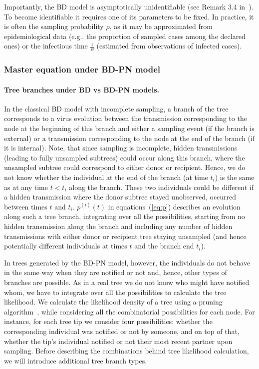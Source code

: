 \documentclass[10pt,letterpaper]{article}
\begin{document}
Importantly, the BD model is asymptotically unidentifiable (see Remark 3.4 in~\cite{Stadler2009}). To become identifiable it requires one of its parameters to be fixed. In practice, it is often the sampling probability $\rho$, as it may be approximated from epidemiological data (e.g., the proportion of sampled cases among the declared ones) or the infectious time $\frac{1}{\psi}$ (estimated from observations of infected cases). 

\subsubsection*{Master equation under BD-PN model}

\paragraph{Tree branches under BD vs BD-PN models.}

In the classical BD model with incomplete sampling, a branch of the tree corresponds to a virus evolution between the transmission corresponding to the node at the beginning of this branch and either a sampling event (if the branch is external) or a transmission corresponding to the node at the end of the branch (if it is internal). Note, that since sampling is incomplete, hidden transmissions (leading to fully unsampled subtrees) could occur along this branch, where the unsampled subtree could correspond to either donor or recipient.  Hence, we do not know whether the individual at the end of the branch (at time $t_i$) is the same as at any time $t < t_i$ along the branch. These two individuals could be different if a hidden transmission where the donor subtree stayed unobserved, occurred between times $t$ and $t_i$. $p^{(i)}(t)$ in equations~(\ref{eq:p}) describes an evolution along such a tree branch, integrating over all the possibilities, starting from no hidden transmission along the branch and including any number of hidden transmissions with either donor or recipient tree staying unsampled (and hence potentially different individuals at times $t$ and the branch end $t_i$).

In trees generated by the BD-PN model, however, the individuals do not behave in the same way when they are notified or not and, hence, other types of branches are possible. As in a real tree we do not know who might have notified whom, we have to integrate over all the possibilities to calculate the tree likelihood. We calculate the likelihood density of a tree using a pruning algorithm~\cite{10.1093/sysbio/22.3.240}, while considering all the combinatorial possibilities for each node. For instance, for each tree tip we consider four possibilities: whether the corresponding individual was notified or not by someone, and on top of that, whether the tip's individual notified or not their most recent partner upon sampling. Before describing the combinations behind tree likelihood calculation, we will introduce additional tree branch types.
\end{document}
